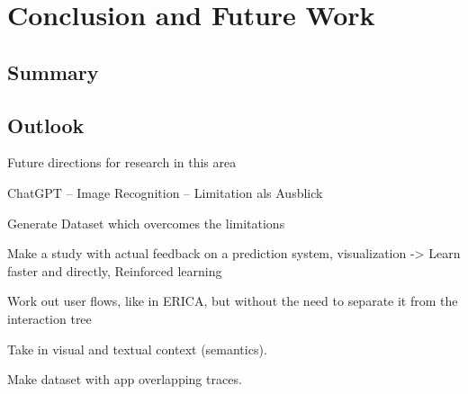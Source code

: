 \chapter{Conclusion and Future Work}
\label{sec:zusfas}

\section*{Summary}
\section*{Outlook}

Future directions for research in this area

ChatGPT – Image Recognition – Limitation als Ausblick

Generate Dataset which overcomes the limitations

Make a study with actual feedback on a prediction system, visualization
-> Learn faster and directly, Reinforced learning

Work out user flows, like in ERICA, but without the need to separate it from the interaction tree

Take in visual and textual context (semantics).

Make dataset with app overlapping traces.
